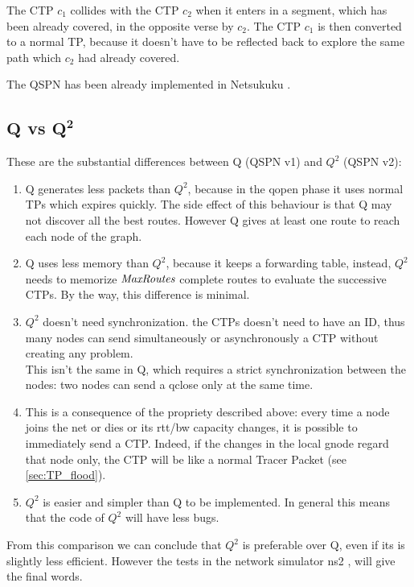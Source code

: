 \documentclass[a4paper]{article}
\begin{document}
The CTP $c_1$ collides with the CTP $c_2$ when it enters in a segment, which
has been already covered, in the opposite verse by $c_2$. The CTP $c_1$ is
then converted to a normal TP, because it doesn't have to be reflected back to
explore the same path which $c_2$ had already covered.

The QSPN has been already implemented in Netsukuku \cite{ntksite}.

\subsection{$\mathbf{Q}$ vs $\mathbf{Q^2}$}
These are the substantial differences between Q (QSPN v1) and $Q^2$ (QSPN v2):
\begin{enumerate}
	\item Q generates less packets than $Q^2$, because in the qopen
		phase it uses normal TPs which expires quickly. The side
		effect of this behaviour is that Q may not discover all
		the best routes. However Q gives at least one route to
		reach each node of the graph.

	\item Q uses less memory than $Q^2$, because it keeps a
		forwarding table, instead, $Q^2$ needs to memorize 
		$\emph{MaxRoutes}$ complete routes to evaluate the successive
		CTPs. By the way, this difference is minimal.

	\item $Q^2$ doesn't need synchronization. the CTPs doesn't need to
		have an ID, thus many nodes can send simultaneously or
		asynchronously a CTP without creating any problem.\\
		This isn't the same in Q, which requires a strict
		synchronization between the nodes: two nodes can send 
		a qclose only at the same time.
	
	\item This is a consequence of the propriety described above: every
		time a node joins the net or dies or its rtt/bw capacity
		changes, it is possible to immediately send a CTP. Indeed, if
		the changes in the local gnode regard that node only, the CTP
		will be like a normal Tracer Packet (see \ref{sec:TP_flood}).

	\item $Q^2$ is easier and simpler than Q to be implemented. In
		general this means that the code of $Q^2$ will have less
		bugs.
\end{enumerate}

From this comparison we can conclude that $Q^2$ is preferable over Q,
even if its is slightly less efficient.
However the tests in the network simulator ns2 \cite{ns2}, will give the final
words.
\end{document}
